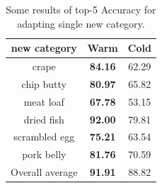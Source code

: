 \begin{table}[htbp]
  \centering
  \caption{Some results of top-5 Accuracy for adapting single new category.}
    \begin{tabular}{c|cc}
    \toprule
       new category   & \multicolumn{1}{c}{Warm} & \multicolumn{1}{c}{Cold}  \\
        \midrule
    crape & \textbf{84.16} & 62.29 \\
   chip butty & \textbf{80.97} & 65.82 \\
    meat loaf & \textbf{67.78} & 53.15 \\
    dried fish & \textbf{92.00}    & 79.81  \\
   scrambled egg & \textbf{75.21} & 63.54  \\
    pork belly & \textbf{81.76 }& 70.59  \\
    \midrule
    Overall average &\textbf{91.91}&88.82  \\
    \bottomrule
    \end{tabular}%
  \label{tab:N+1}%
\end{table}%

